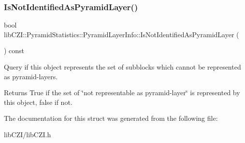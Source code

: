 \subsubsection{\texorpdfstring{Is\+Not\+Identified\+As\+Pyramid\+Layer()}{IsNotIdentifiedAsPyramidLayer()}}
{\footnotesize\ttfamily bool lib\+C\+Z\+I\+::\+Pyramid\+Statistics\+::\+Pyramid\+Layer\+Info\+::\+Is\+Not\+Identified\+As\+Pyramid\+Layer (\begin{DoxyParamCaption}{ }\end{DoxyParamCaption}) const\hspace{0.3cm}{\ttfamily [inline]}}

Query if this object represents the set of subblocks which cannot be represented as pyramid-\/layers.

\begin{DoxyReturn}{Returns}
True if the set of \char`\"{}not representable as pyramid-\/layer\char`\"{} is represented by this object, false if not. 
\end{DoxyReturn}


The documentation for this struct was generated from the following file\+:\begin{DoxyCompactItemize}
\item 
lib\+C\+Z\+I/lib\+C\+Z\+I.\+h\end{DoxyCompactItemize}
